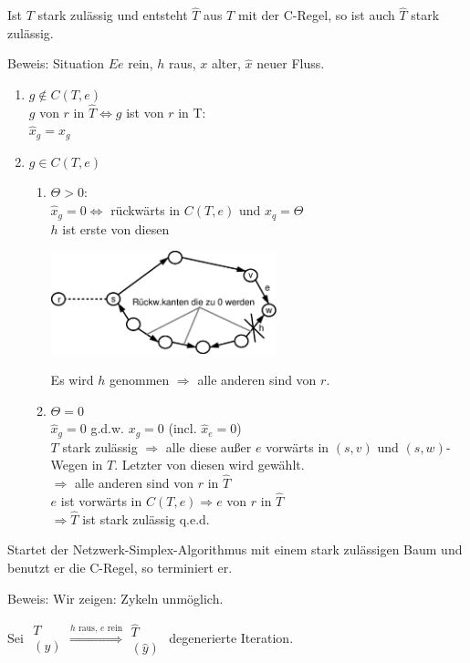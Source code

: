 \begin{lemma}
Ist $T$ stark zulässig und entsteht $\hat{T}$ aus $T$ mit der C-Regel, so
ist auch $\hat{T}$ stark zulässig.
\end{lemma}
Beweis: Situation $Ee$ rein, $h$ raus, $x$ alter, $\hat{x}$ neuer Fluss.
\begin{enumerate}
\item $g\not \in C(T,e)$\\
$g$ von $r$ in $\hat{T} \Leftrightarrow g$ ist von $r$ in T:\\
$\hat{x}_{g} = x_{g}$
\item $g \in C(T,e)$
\begin{enumerate}
\item $\Theta > 0$:\\
$\hat{x}_{g} = 0 \Leftrightarrow$ rückwärts in $C(T,e)$ und $x_{q} =
\Theta$\\
$h$ ist erste von diesen

\includegraphics[height=3cm]{bilder/4-2NetzSTransB2}

Es wird $h$ genommen $\Rightarrow$ alle anderen sind von $r$.
\item $\Theta = 0$\\
$\hat{x}_{g}=0$ g.d.w. $x_{g} = 0 $ (incl. $\hat{x}_{e} = 0$)\\
$T$ stark zulässig $\Rightarrow$ alle diese außer $e$ vorwärts in $(s,v)$
und $(s,w)$-Wegen in $T$. Letzter von diesen wird gewählt.\\
$ \Rightarrow$ alle anderen sind von $r$ in $\hat{T}$\\
$e$ ist vorwärts in $C(T,e) \Rightarrow e$ von $r$ in $\hat{T}$\\
$\Rightarrow \hat{T}$ ist stark zulässig q.e.d.\\
\end{enumerate}
\end{enumerate}
\begin{satz}
Startet der Netzwerk-Simplex-Algorithmus mit einem stark zulässigen Baum
und benutzt er die C-Regel, so terminiert er.
\end{satz}
Beweis: Wir zeigen: Zykeln unmöglich.

Sei $\begin{array}{c}T\\(y)\end{array} \stackrel{h\mbox{ raus, } e 
\mbox{ rein}}{\Longrightarrow} \begin{array}{c}\hat{T}\\(\hat{y})\end{array}$
degenerierte Iteration.

